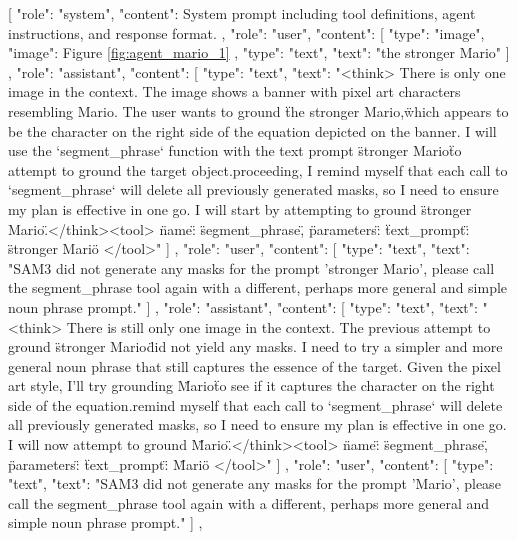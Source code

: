 [
    {
        "role": "system",
        "content": {System prompt including tool definitions, agent instructions, and response format.}
    },
    {
        "role": "user",
        "content": [
            {
                "type": "image",
                "image": Figure {\ref{fig:agent_mario_1}}
            },
            {
                "type": "text",
                "text": "the stronger Mario"
            }
        ]
    },
    {
        "role": "assistant",
        "content": [
            {
                "type": "text",
                "text": "<think> There is only one image in the context. The image shows a banner with pixel art characters resembling Mario. The user wants to ground \"the stronger Mario,\" which appears to be the character on the right side of the equation depicted on the banner. I will use the `segment_phrase` function with the text prompt \"stronger Mario\" to attempt to ground the target object.\n\nBefore proceeding, I remind myself that each call to `segment_phrase` will delete all previously generated masks, so I need to ensure my plan is effective in one go. I will start by attempting to ground \"stronger Mario.\"\n\n</think>\n<tool> {\"name\": \"segment_phrase\", \"parameters\": {\"text_prompt\": \"stronger Mario\"}} </tool>\n\n"
            }
        ]
    },
    {
        "role": "user",
        "content": [
            {
                "type": "text",
                "text": "SAM3 did not generate any masks for the prompt 'stronger Mario', please call the segment_phrase tool again with a different, perhaps more general and simple noun phrase prompt."
            }
        ]
    },
    {
        "role": "assistant",
        "content": [
            {
                "type": "text",
                "text": "<think> There is still only one image in the context. The previous attempt to ground \"stronger Mario\" did not yield any masks. I need to try a simpler and more general noun phrase that still captures the essence of the target. Given the pixel art style, I'll try grounding \"Mario\" to see if it captures the character on the right side of the equation.\n\nI remind myself that each call to `segment_phrase` will delete all previously generated masks, so I need to ensure my plan is effective in one go. I will now attempt to ground \"Mario.\"\n\n</think>\n<tool> {\"name\": \"segment_phrase\", \"parameters\": {\"text_prompt\": \"Mario\"}} </tool>\n\n"
            }
        ]
    },
    {
        "role": "user",
        "content": [
            {
                "type": "text",
                "text": "SAM3 did not generate any masks for the prompt 'Mario', please call the segment_phrase tool again with a different, perhaps more general and simple noun phrase prompt."
            }
        ]
    },
